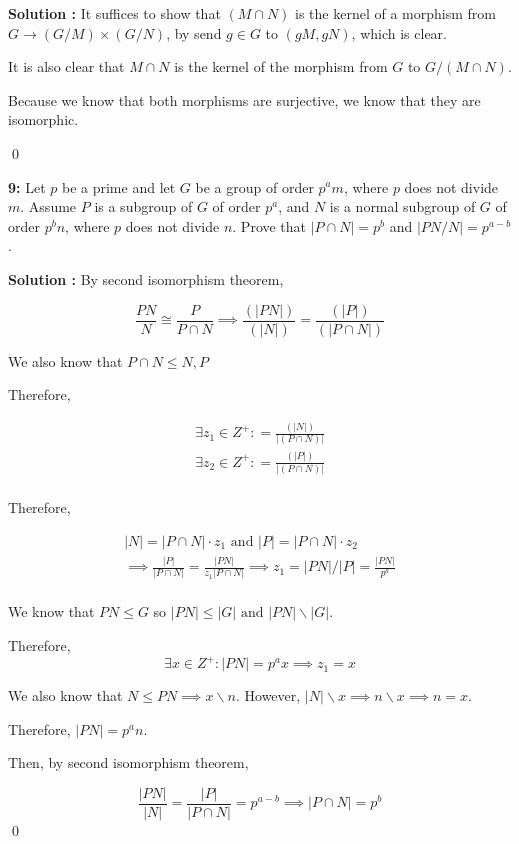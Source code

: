 \documentclass[11pt]{article}
\newcommand{\AND}{\text{ and }}
\newenvironment{exercise}[1]
	{\noindent \textbf{#1:}}
	{\par \vspace{0.5\baselineskip}}
\newenvironment{solution}[1][\unskip]
	{\noindent \textbf{Solution #1:} }
	{\qed \pagebreak}
\begin{document}
\begin{solution}
	It suffices to show that $(M \cap N)$ is the kernel of
	a morphism from $G \to (G / M) \times (G / N)$, by send
	$g \in G$ to $(gM, gN)$, which is clear.

	It is also clear that $M\cap N$ is the kernel of the morphism from $G$ to $G/(M \cap N)$.

	Because we know that both morphisms are surjective, we know that they are isomorphic.

\end{solution}

\begin{exercise}{9}
	Let $p$ be a prime and let $G$ be a group of order $p^am$,
	where $p$ does not divide $m$.
	Assume $P$ is a subgroup of $G$ of order $p^a$,
	and $N$ is a normal subgroup of $G$ of order $p^bn$,
	where $p$ does not divide $n$.
	Prove that $|P \cap N| = p^b$ and $|PN / N| = p^{a-b}$.
\end{exercise}

\begin{solution}
	By second isomorphism theorem,

	\[
		\frac{PN}{N} \cong \frac{P}{P \cap N}
		\implies \frac{(|PN|)}{(|N|)} = \frac{(|P|)}{(|P \cap N|)}
	\]

	We also know that $P \cap N \le N,P$

	Therefore,

	\[
		\begin{split}
			\exists z_1 \in Z^+ : = \frac{(|N|)}{|(P \cap N)|} \\
			\exists z_2 \in Z^+ : = \frac{(|P|)}{|(P \cap N)|} \\
		\end{split}
	\]

	Therefore,

	\[
		\begin{split}
			|N| = |P \cap N| \cdot z_1 \AND |P| = |P \cap N| \cdot z_2\\
			\implies \frac{|P|}{|P \cap N|} = \frac{|PN|}{z_1|P \cap N|}
			\implies z_1= |PN| / |P| = \frac{|PN|}{p^a} \\
		\end{split}
	\]

	We know that $PN \leqslant G$ so $|PN| \leqslant |G| \AND |PN| \backslash |G|$.

	Therefore,
	\[
		\exists x \in Z^+ : |PN| = p^ax \implies z_1 = x
	\]

	We also know that $N \leqslant PN \implies x \backslash n$.
	However, $|N| \backslash x \implies n \backslash x \implies n=x$.

	Therefore, $|PN| = p^an$.

	Then, by second isomorphism theorem,

	\[
	\frac{|PN|}{|N|} = \frac{|P|}{|P \cap N|} = p^{a-b} \implies |P \cap N| = p^b
	\]
\end{solution}
\end{document}
